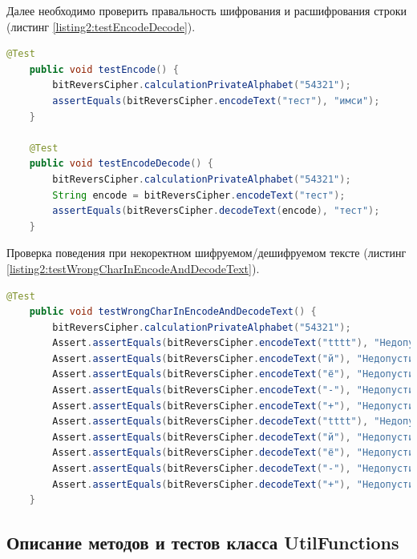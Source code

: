 \documentclass[a4paper,12pt]{article}
\begin{document}
Далее необходимо проверить правальность шифрования и расшифрования строки (листинг \ref{listing2:testEncodeDecode}).
\begin{lstlisting}[language=java, caption=метод calculationPrivateAlphabet, label=listing2:testEncodeDecode]
	@Test
    public void testEncode() {
        bitReversCipher.calculationPrivateAlphabet("54321");
        assertEquals(bitReversCipher.encodeText("тест"), "имси");
    }

    @Test
    public void testEncodeDecode() {
        bitReversCipher.calculationPrivateAlphabet("54321");
        String encode = bitReversCipher.encodeText("тест");
        assertEquals(bitReversCipher.decodeText(encode), "тест");
    }
\end{lstlisting}
Проверка поведения при некоректном шифруемом/дешифруемом тексте (листинг \ref{listing2:testWrongCharInEncodeAndDecodeText}).
\begin{lstlisting}[language=java, caption=метод calculationPrivateAlphabet, label=listing2:testWrongCharInEncodeAndDecodeText]
    @Test
    public void testWrongCharInEncodeAndDecodeText() {
        bitReversCipher.calculationPrivateAlphabet("54321");
        Assert.assertEquals(bitReversCipher.encodeText("tttt"), "Недопустимый символ. Шифрование не возможно");
        Assert.assertEquals(bitReversCipher.encodeText("й"), "Недопустимый символ. Шифрование не возможно");
        Assert.assertEquals(bitReversCipher.encodeText("ё"), "Недопустимый символ. Шифрование не возможно");
        Assert.assertEquals(bitReversCipher.encodeText("-"), "Недопустимый символ. Шифрование не возможно");
        Assert.assertEquals(bitReversCipher.encodeText("+"), "Недопустимый символ. Шифрование не возможно");
        Assert.assertEquals(bitReversCipher.decodeText("tttt"), "Недопустимый символ. Расшифровка не возможно");
        Assert.assertEquals(bitReversCipher.decodeText("й"), "Недопустимый символ. Расшифровка не возможно");
        Assert.assertEquals(bitReversCipher.decodeText("ё"), "Недопустимый символ. Расшифровка не возможно");
        Assert.assertEquals(bitReversCipher.decodeText("-"), "Недопустимый символ. Расшифровка не возможно");
        Assert.assertEquals(bitReversCipher.decodeText("+"), "Недопустимый символ. Расшифровка не возможно");
    }
\end{lstlisting}

\subsection{Описание методов и тестов класса UtilFunctions}
\end{document}
